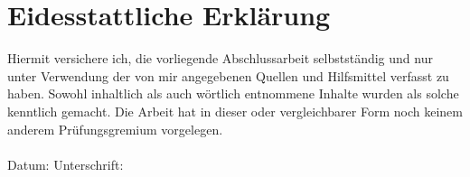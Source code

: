 

\chapter*{Eidesstattliche Erklärung}
\label{erklaerung}

Hiermit versichere ich, die vorliegende Abschlussarbeit selbstständig und nur unter Verwendung der von mir angegebenen Quellen und Hilfsmittel verfasst zu haben. Sowohl inhaltlich als auch wörtlich entnommene Inhalte wurden als solche kenntlich gemacht. Die Arbeit hat in dieser oder vergleichbarer Form noch keinem anderem Prüfungsgremium vorgelegen. \\
\\[1.5cm]
Datum:	\hrulefill\enspace Unterschrift: \hrulefill
\\[3.5cm]



